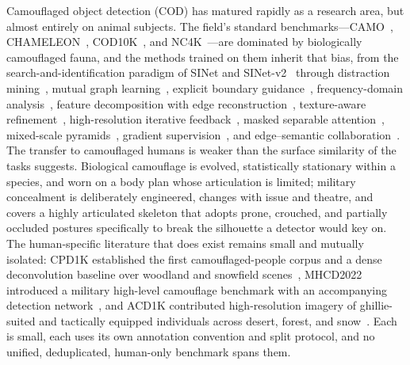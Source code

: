 \documentclass[3p,times,procedia]{elsarticle}
\begin{document}
Camouflaged object detection (COD) has matured rapidly as a research area, but almost entirely on animal subjects. The field's standard benchmarks---CAMO~\cite{camo}, CHAMELEON~\cite{chameleon}, COD10K~\cite{sinet}, and NC4K~\cite{nc4k}---are dominated by biologically camouflaged fauna, and the methods trained on them inherit that bias, from the search-and-identification paradigm of SINet and SINet-v2~\cite{sinet,sinetv2} through distraction mining~\cite{pfnet}, mutual graph learning~\cite{mgl}, explicit boundary guidance~\cite{bgnet}, frequency-domain analysis~\cite{fdnet}, feature decomposition with edge reconstruction~\cite{feder}, texture-aware refinement~\cite{tanet}, high-resolution iterative feedback~\cite{hitnet}, masked separable attention~\cite{camoformer}, mixed-scale pyramids~\cite{zoomnext}, gradient supervision~\cite{dgnet}, and edge--semantic collaboration~\cite{escnet}. The transfer to camouflaged humans is weaker than the surface similarity of the tasks suggests. Biological camouflage is evolved, statistically stationary within a species, and worn on a body plan whose articulation is limited; military concealment is deliberately engineered, changes with issue and theatre, and covers a highly articulated skeleton that adopts prone, crouched, and partially occluded postures specifically to break the silhouette a detector would key on. The human-specific literature that does exist remains small and mutually isolated: CPD1K established the first camouflaged-people corpus and a dense deconvolution baseline over woodland and snowfield scenes~\cite{ddcn}, MHCD2022 introduced a military high-level camouflage benchmark with an accompanying detection network~\cite{mhnet}, and ACD1K contributed high-resolution imagery of ghillie-suited and tactically equipped individuals across desert, forest, and snow~\cite{acd1k}. Each is small, each uses its own annotation convention and split protocol, and no unified, deduplicated, human-only benchmark spans them.
\end{document}
